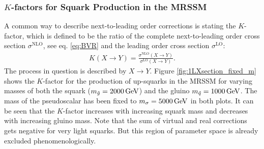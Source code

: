 \subsubsection{$K$-factors for Squark Production in the MRSSM}
A common way to describe next-to-leading order corrections is stating the $K$-factor, which is defined to be the ratio of the complete next-to-leading order cross section $\sigma^{\mathrm{NLO}}$, see eq. \eqref{eq:BVR} and the leading order cross section $\sigma^{\mathrm{LO}}$:
\begin{align}
K(X \to Y) = \frac{\sigma^{\mathrm{NLO}}(X \to Y)}{\sigma^{\mathrm{LO}}(X \to Y)}.
\end{align}
The process in question is described by $X \to Y$.
Figure \ref{fig:1LXsection_fixed_m} shows the $K$-factor for the production of up-squarks in the MRSSM for varying masses of both the squark ($m_{\tilde{g}} = \unit[2000]{GeV}$) and the gluino $m_{\tilde{q}} = \unit[1000]{GeV}$. The mass of the pseudoscalar has been fixed to $m_{\sigma} = \unit[5000]{GeV}$ in both plots. It can be seen that the  $K$-factor increases with increasing squark mass and decreases with increasing gluino mass. Note that the sum of virtual and real corrections gets negative for very light squarks. But this region of parameter space is already excluded phenomenologically.
